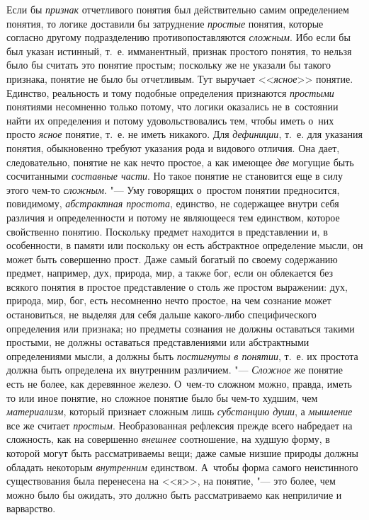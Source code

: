 Если бы {\em признак} отчетливого понятия был действительно самим определением
понятия, то логике доставили бы затруднение {\em простые} понятия,
которые согласно другому подразделению противопоставляются {\em сложным}. Ибо
если бы был указан истинный, т.~е. имманентный, признак простого понятия, то
нельзя было бы считать это понятие простым; поскольку же не указали бы
такого признака, понятие не было бы отчетливым. Тут выручает <<{\em ясное}>>
понятие. Единство, реальность и тому подобные определения признаются
{\em простыми} понятиями несомненно только потому, что логики оказались не
в~состоянии найти их определения и потому удовольствовались тем, чтобы иметь
о~них просто {\em ясное} понятие, т.~е. не иметь никакого. Для {\em дефиниции},
т.~е. для указания понятия, обыкновенно требуют указания рода и видового
отличия. Она дает, следовательно, понятие не как нечто простое, а как имеющее
{\em две} могущие быть сосчитанными {\em составные части}. Но такое понятие
не становится еще в силу этого чем-то {\em сложным}. "--- Уму говорящих
о~простом понятии предносится, повидимому, {\em абстрактная простота},
единство, не содержащее внутри себя различия и определенности
и потому не являющееся тем единством, которое свойственно понятию.
Поскольку предмет находится в представлении и, в особенности, в памяти или
поскольку он есть абстрактное определение мысли, он может быть совершенно
прост. Даже самый богатый по своему содержанию предмет, например, дух,
природа, мир, а также бог, если он облекается без всякого понятия в простое
представление о столь же простом выражении: дух, природа, мир, бог, есть
несомненно нечто простое, на чем сознание может остановиться, не выделяя
для себя дальше какого-либо специфического определения или признака; но
предметы сознания не должны оставаться такими простыми, не должны
оставаться представлениями или абстрактными определениями мысли, а должны
быть {\em постигнуты в понятии}, т.~е. их простота должна быть определена их
внутренним различием. "--- {\em Сложное} же понятие есть не более, как
деревянное железо. О~чем-то сложном можно, правда, иметь то или иное понятие,
но сложное понятие было бы чем-то худшим, чем {\em материализм}, который
признает сложным лишь {\em субстанцию души}, а {\em мышление} все же считает
{\em простым}. Необразованная рефлексия прежде всего набредает на сложность,
как на совершенно {\em внешнее} соотношение, на худшую форму, в которой могут
быть рассматриваемы вещи; даже самые низшие природы должны обладать некоторым
{\em внутренним} единством. А~чтобы форма самого неистинного существования была
перенесена на <<я>>, на понятие, "--- это более, чем можно было бы ожидать, это
должно быть рассматриваемо как неприличие и варварство.

